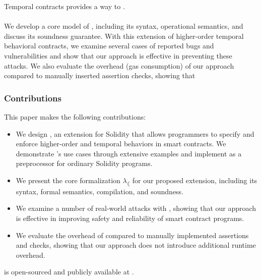 Temporal contracts provides a way to .

\paragraph{}

We develop a core model of \lang, including its syntax, operational semantics,
and discuss its soundness guarantee.
With this extension of higher-order temporal behavioral contracts, we examine
several cases of reported bugs and vulnerabilities and show that
our approach is effective in preventing these attacks.
We also evaluate the overhead (gas consumption) of our approach
compared to manually inserted assertion checks, showing that 




\subsubsection*{\textbf{Contributions}} This paper makes the following contributions:
\begin{itemize}
  \item We design \lang, an extension for Solidity that allows programmers to
        specify and enforce higher-order and temporal behaviors in smart contracts.
        We demonstrate \lang's use cases through extensive examples and
        implement \lang as a preprocessor for ordinary Solidity programs.
	\item We present the core formalization $\lambda_\lang$ for our proposed
	      extension, including its syntax, formal semantics, compilation, and
	      soundness.
  \item We examine a number of real-world attacks with \lang, showing that our
        approach is effective in improving safety and reliability of smart contract
        programs.
  \item We evaluate the overhead of \lang compared to manually implemented
        assertions and checks, showing that our approach does not introduce
        additional runtime overhead.
\end{itemize}
\lang is open-sourced and publicly available at .

